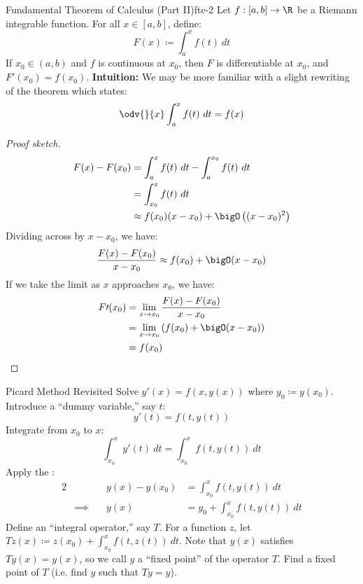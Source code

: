 \begin{thmbox}{Fundamental Theorem of Calculus (Part II)}{ftc-2}
    Let $f : [a,b] \to \R$ be a Riemann integrable function. For all $x \in [a,b]$, define:
    \[ F(x) \coloneq \int_{a}^{x} f(t)\ dt \]
    If $x_0 \in (a,b)$ and $f$ is continuous at $x_0$, then $F$ is differentiable at $x_0$, and $F\prime(x_0) = f(x_0)$.
    \tcblower
    \textbf{Intuition:} We may be more familiar with a slight rewriting of the theorem which states:
    \[ \odv{}{x} \int_a^x f(t)\ dt = f(x) \]
    \begin{proof}[Proof sketch]
        \begin{align*}
            F(x) - F(x_0)
            &= \int_a^x f(t)\ dt - \int_a^{x_0} f(t)\ dt \\
            &= \int_{x_0}^{x} f(t)\ dt \\
            &\approx f(x_0) (x - x_0) + \bigO \left( (x - x_0)^2 \right)
        \end{align*}
        Dividing across by $x - x_0$, we have:
        \[ \frac{F(x) - F(x_0)}{x - x_0} \approx f(x_0) + \bigO(x - x_0) \]
        If we take the limit as $x$ approaches $x_0$, we have:
        \begin{align*}
             F\prime(x_0)
             &= \lim_{x \to x_0} \frac{F(x) - F(x_0)}{x - x_0} \\
             &= \lim_{x \to x_0} \left( f(x_0) + \bigO(x - x_0) \right) \\
             &= f(x_0)
        \end{align*}
    \end{proof}
\end{thmbox}

\begin{exbox}{Picard Method Revisited}{}
    Solve $y\prime(x) = f(x, y(x))$ where $y_0 \coloneq y(x_0)$.
    \tcblower
    Introduce a ``dummy variable,'' say $t$:
    \[ y\prime(t) = f(t, y(t)) \]
    Integrate from $x_0$ to $x$:
    \[ \int_{x_0}^{x} y\prime(t)\ dt = \int_{x_0}^{x} f(t, y(t))\ dt \]
    Apply the :
    \begin{alignat*}{2}
        && y(x) - y(x_0) &= \int_{x_0}^{x} f(t, y(t))\ dt \\
        & \implies \quad & y(x) &= y_0 + \int_{x_0}^{x} f(t, y(t))\ dt
    \end{alignat*}
    Define an ``integral operator,'' say $T$. For a function $z$, let $Tz(x) \coloneq z(x_0) + \int_{x_0}^{x} f(t, z(t))\ dt$. Note that $y(x)$ satisfies $Ty(x) = y(x)$, so we call $y$ a ``fixed point'' of the operator $T$. Find a fixed point of $T$ (i.e. find $y$ such that $Ty = y$).
\end{exbox}
